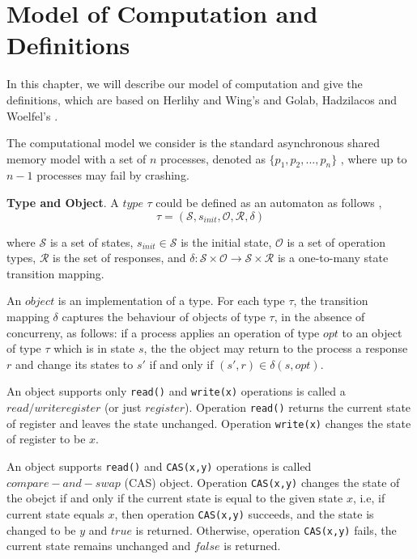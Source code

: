 
\chapter{Model of Computation and Definitions}
In this chapter, we will describe our model of computation and give the definitions, which are based on Herlihy
and Wing's \cite{Herlihy:1990:LCC:78969.78972} and Golab, Hadzilacos and Woelfel's \cite{InProc-GHHW2007a}.

The computational model we consider is the standard asynchronous shared memory model with a set of $n$ processes,
denoted as $\{p_1, p_2,...,p_n\}$ , where up to $n-1$ processes may fail by crashing.


\textbf{Type and Object}.
A $type$ $\tau$ could be defined as an automaton as follows \cite{InProc-GHHW2007a},
$$\tau = (\mathcal{S}, s_{init},\mathcal{O},\mathcal{R} ,\delta )$$

where $\mathcal{S}$ is a set of states, $s_{init} \in \mathcal{S}$ is the initial state, $\mathcal{O}$ is a set of
operation types, $\mathcal{R}$ is the set of responses, and
$\delta :\mathcal{S} \times \mathcal{O} \to \mathcal{S} \times \mathcal{R}$ is a one-to-many state transition mapping.

An $object$ is an implementation of a type. For each type $\tau$, the transition mapping $\delta$ captures the
behaviour of objects of type $\tau$, in the absence of concurreny,
as follows: if a process applies an operation of type $opt$ to an object of type $\tau$ which is in state $s$, the the object
may return to the process a response $r$ and change its states to $s'$ if and only if $(s', r) \in \delta(s, opt)$.

An object supports only \texttt{read()} and \texttt{write(x)} operations is called a $read/write register$
(or just $register$). Operation \texttt{read()} returns the current state of register and leaves the state unchanged.
Operation \texttt{write(x)} changes the state of register to be $x$.

An object supports \texttt{read()} and \texttt{CAS(x,y)} operations is called $compare-and-swap$ (CAS) object.
Operation \texttt{CAS(x,y)} changes the state of the obejct if and only if the current state is equal to the given state $x$, i.e,
if current state equals $x$, then operation \texttt{CAS(x,y)} succeeds, and the state is changed
to be $y$ and $true$ is returned. Otherwise, operation \texttt{CAS(x,y)} fails, the current state remains unchanged and
$false$ is returned.

